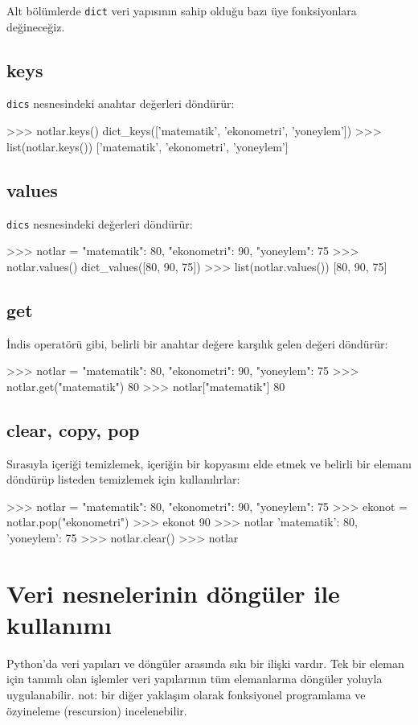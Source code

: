 \documentclass[12pt]{report}
\begin{document}
Alt bölümlerde \texttt{dict} veri yapısının sahip olduğu bazı üye fonksiyonlara değineceğiz.

\subsection{keys}
\texttt{dics} nesnesindeki anahtar değerleri döndürür:

\begin{python}
>>> notlar.keys()
dict_keys(['matematik', 'ekonometri', 'yoneylem'])
>>> list(notlar.keys())
['matematik', 'ekonometri', 'yoneylem']
\end{python}

\subsection{values}
\texttt{dics} nesnesindeki  değerleri döndürür:

\begin{python}
>>> notlar = {"matematik": 80, "ekonometri": 90, "yoneylem": 75}
>>> notlar.values()
dict_values([80, 90, 75])
>>> list(notlar.values())
[80, 90, 75]
\end{python}


\subsection{get}
İndis operatörü gibi, belirli bir anahtar değere karşılık gelen değeri döndürür:

\begin{python}
>>> notlar = {"matematik": 80, "ekonometri": 90, "yoneylem": 75}
>>> notlar.get("matematik")
80
>>> notlar["matematik"]
80
\end{python}


\subsection{clear, copy, pop}
Sırasıyla içeriği temizlemek, içeriğin bir kopyasını elde etmek ve belirli bir elemanı döndürüp listeden temizlemek için kullanılırlar:

\begin{python}
>>> notlar = {"matematik": 80, "ekonometri": 90, "yoneylem": 75}
>>> ekonot = notlar.pop("ekonometri")
>>> ekonot
90
>>> notlar
{'matematik': 80, 'yoneylem': 75}
>>> notlar.clear()
>>> notlar
{}
\end{python}


\section{Veri nesnelerinin döngüler ile kullanımı}
Python'da veri yapıları ve döngüler arasında sıkı bir ilişki vardır. Tek bir eleman için tanımlı olan işlemler veri yapılarının tüm elemanlarına döngüler yoluyla uygulanabilir. not: bir diğer yaklaşım olarak fonksiyonel programlama ve özyineleme (rescursion) incelenebilir.
\end{document}
